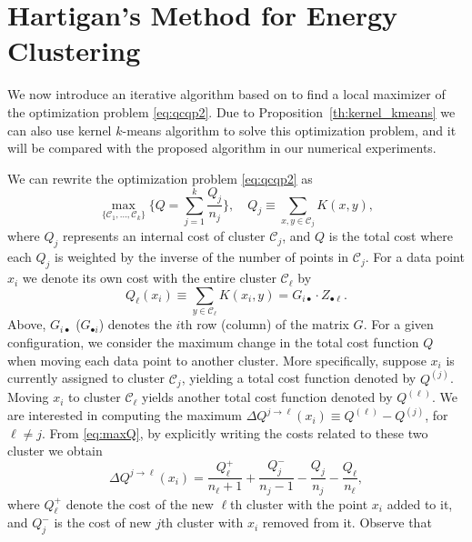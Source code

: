 \documentclass{article}
\newcommand\kk{K}
\newcommand\C{{\mathcal{C}}}
\begin{document}
\section{Hartigan's Method for Energy Clustering}
\label{sec:algo}

We now introduce an iterative algorithm based
on \citet{Hartigan} to find a local
maximizer of the optimization problem \eqref{eq:qcqp2}. Due to 
Proposition~\ref{th:kernel_kmeans} we can also use 
kernel $k$-means algorithm \citep{Dhillon2,Dhillon} to solve
this optimization problem, and it
will be compared with the proposed algorithm in our numerical experiments. 

We can rewrite the optimization problem \eqref{eq:qcqp2} as
\begin{equation}
\label{eq:maxQ}
\max_{\{ \C_1,\dotsc,\C_k \}} 
\bigg\{ Q = \sum_{j=1}^k \dfrac{Q_j}{n_j}  \bigg\},
\quad Q_j \equiv \sum_{x,y\in\C_j} \kk(x,y),
\end{equation}
where $Q_j$ represents an internal cost of cluster $\C_j$, and
$Q$ is the total cost where each $Q_j$ 
is weighted by the inverse
of the number of points in $\C_j$. For a data point $x_i$ we denote
its own cost
with the entire cluster $\C_\ell$ by
\begin{equation}
\label{eq:costxij}
Q_\ell(x_i) \equiv \sum_{y\in\C_\ell} \kk(x_i, y) = 
G_{i \bullet} \cdot Z_{\bullet \ell}.
\end{equation}
Above, $G_{i\bullet}$ ($G_{\bullet i}$) denotes
the $i$th row (column) of the matrix $G$.
For a given configuration, we consider the maximum change
in the total cost function $Q$ when moving each data point to
another cluster. More specifically, 
suppose $x_i$
is currently assigned to  cluster $\C_j$, yielding
a total cost function denoted by $Q^{(j)}$.
Moving $x_i$ to cluster $\C_\ell$ yields another total cost function
denoted by $Q^{(\ell)}$. We are interested in computing the maximum 
$\Delta Q^{j\to \ell} (x_i) \equiv Q^{(\ell)} - Q^{(j)}$, for $\ell\ne j$. 
From \eqref{eq:maxQ}, by explicitly writing the costs related to these 
two cluster we obtain
\begin{equation}
\Delta Q^{j\to \ell} (x_i) = \dfrac{Q_\ell^{+}}{n_\ell+1} + 
\dfrac{Q_j^-}{n_j-1} - \dfrac{Q_j}{n_j} - \dfrac{Q_\ell}{n_\ell} ,
\end{equation}
where $Q^{+}_\ell$ denote the cost of the new $\ell$th cluster
with the point $x_i$ added to it, and $Q^-_j$ is the cost of new 
$j$th cluster with $x_i$ removed from it. Observe that 
\end{document}
